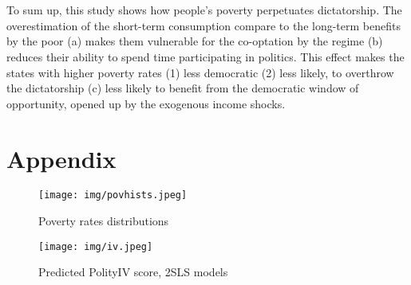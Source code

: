 \documentclass[a4paper, 12pt]{article}
\begin{document}
	\\\\
	To sum up, this study shows how people's poverty perpetuates dictatorship. The overestimation of the short-term consumption compare to the long-term benefits by the poor (a) makes them vulnerable for the co-optation by the regime (b) reduces their ability to spend time participating in politics. This effect makes the states with higher poverty rates (1) less democratic (2) less likely, to overthrow the dictatorship (c) less likely to benefit from the democratic window of opportunity, opened up by the exogenous income shocks.
	
	
	\newpage
    \section{Appendix}
	
	
	
	
	
	\begin{figure}[ht]
	    \centering
	    \texttt{[image: img/povhists.jpeg]}
	    \caption{Poverty rates distributions}
	    \label{fig:povhists}
	\end{figure}
	
    \begin{figure}[ht]
	    \centering
	    \texttt{[image: img/iv.jpeg]}
	    \caption{Predicted PolityIV score, 2SLS models}
	    \label{fig:iv}
	\end{figure}
	
	
\end{document}
